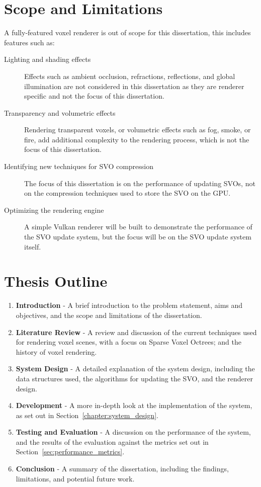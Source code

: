 \section{Scope and Limitations}
A fully-featured voxel renderer is out of scope for this dissertation, this includes features such as:

\begin{description}
    \item[Lighting and shading effects] Effects such as ambient occlusion, refractions, reflections, and global illumination
        are not considered in this dissertation as they are renderer specific and not the focus of this dissertation.
    \item[Transparency and volumetric effects] Rendering transparent voxels, or volumetric effects such as fog, smoke, or
        fire, add additional complexity to the rendering process, which is not the focus of this dissertation.
    \item[Identifying new techniques for SVO compression] The focus of this dissertation is on the performance of updating
        SVOs, not on the compression techniques used to store the SVO on the GPU.
    \item[Optimizing the rendering engine] A simple Vulkan renderer will be built to demonstrate the performance of the
        SVO update system, but the focus will be on the SVO update system itself.
\end{description}

\section{Thesis Outline}

\begin{enumerate}
    \item \textbf{Introduction} - A brief introduction to the problem statement, aims and objectives, and the scope and limitations
          of the dissertation.
    \item \textbf{Literature Review} - A review and discussion of the current techniques used for rendering voxel scenes,
          with a focus on Sparse Voxel Octrees; and the history of voxel rendering.
    \item \textbf{System Design} - A detailed explanation of the system design, including the data structures used, the
          algorithms for updating the SVO, and the renderer design.
    \item \textbf{Development} - A more in-depth look at the implementation of the system, as set out in Section~\ref{chapter:system_design}.
    \item \textbf{Testing and Evaluation} - A discussion on the performance of the system, and the results of the evaluation
          against the metrics set out in Section~\ref{sec:performance_metrics}.
    \item \textbf{Conclusion} - A summary of the dissertation, including the findings, limitations, and potential future work.
\end{enumerate}